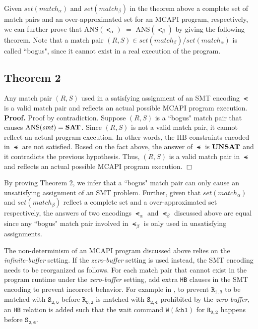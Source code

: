 Given $\mathit{set(match_{\alpha})}$ and $\mathit{set(match_{\beta})}$ in the theorem above a complete set of match pairs and an over-approximated set for an MCAPI program, respectively, we can further prove that $\mathrm{ANS}(\smt_{\alpha})$ $ = $ $\mathrm{ANS}(\smt_{\beta})$ by giving the following theorem. Note that a match pair $(R, S) \in \mathit{set(match_{\beta})}/\mathit{set(match_{\alpha})}$ is called ``bogus", since it cannot exist in a real execution of the program.

\subsection{Theorem 2}
Any match pair $(R, S)$ used in a satisfying assignment of an SMT encoding $\smt$ is a valid match pair and reflects an actual possible MCAPI program execution.
\\
\textbf{Proof.}
Proof by contradiction. Suppose $(R, S)$ is a ``bogus" match pair that causes $\mathrm{ANS}(\mathit{smt}) = \textbf{SAT}$. Since $(R, S)$ is not a valid match pair, it cannot reflect an actual program execution. In other words, the $\mathrm{HB}$ constraints encoded in $\smt$ are not satisfied. Based on the fact above, the answer of $\smt$ is $\textbf{UNSAT}$ and it contradicts the previous hypothesis. Thus, $(R, S)$ is a valid match pair in $\smt$ and reflects an actual possible MCAPI program execution. $\Box$

By proving Theorem 2, we infer that a ``bogus" match pair can only cause an unsatisfying assignment of an SMT problem. Further, given that $\mathit{set(match_{\alpha})}$ and $\mathit{set(match_{\beta})}$ reflect a complete set and a over-approximated set respectively, the answers of two encodings $\smt_{\alpha}$ and $\smt_{\beta}$ discussed above are equal since any ``bogus" match pair involved in $\smt_{\beta}$ is only used in unsatisfying assignments.

The non-determinism of an MCAPI program discussed above relies on the \textit{infinite-buffer} setting. If the \textit{zero-buffer} setting is used instead, the SMT encoding needs to be reorganized as follows. For each match pair that cannot exist in the program runtime under the \textit{zero-buffer} setting, add extra \texttt{HB} clauses in the SMT encoding to prevent incorrect behavior. For example in , to prevent $\mathtt{R_{1,3}}$ to be matched with $\mathtt{S_{2,6}}$ before $\mathtt{R_{0,2}}$ is matched with $\mathtt{S_{2,4}}$ prohibited by the \textit{zero-buffer}, an \texttt{HB} relation is added such that the wait command $\mathtt{W(\&h1)}$ for $\mathtt{R_{0,2}}$ happens before $\mathtt{S_{2,6}}$.













